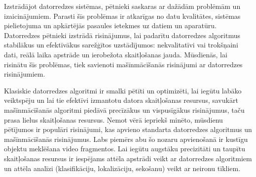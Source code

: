 Izstrādājot datorredzes sistēmas, pētnieki saskaras ar dažādām problēmām un izaicinājumiem. Parasti šīs problēmas ir atkarīgas no datu kvalitātes, sistēmas pielietojuma un apkārtējās pasaules ietekmes uz datiem un aparatūru. Datorredzes pētnieki izstrādā risinājumus, lai padarītu datorredzes algoritmus stabilākus un efektīvākus sarežģītos uzstādījumos: nekvalitatīvi vai trokšņaini dati, reālā laika apstrāde un ierobežota skaitļošanas jauda. Mūsdienās, lai risinātu šīs problēmas, tiek savienoti mašīnmācīšanās risinājumi ar datorredzes risinājumiem.

Klasiskie datorredzes algoritmi ir smalki pētīti un optimizēti, lai iegūtu labāko veiktspēju un lai tie efektīvi izmantotu datora skaitļošanas resursus, savukārt mašīnmācīšanās algoritmi piedāvā precīzākus un vispusīgākus risinājumus, taču prasa lielus skaitļošanas resursus. Ņemot vērā iepriekš minēto, mūsdienu pētījumos ir populāri risinājumi, kas apvieno standarta datorredzes algoritmus un mašīnmācīšanās risinājumus. Labs piemērs abu šo nozaru apvienošanā ir kustīgu objektu meklēšana video fragmentos. Lai iegūtu augstāku precizitāti un taupītu skaitļošanas resursus ir iespējams attēla apstrādi veikt ar datorredzes algoritmiem un attēla analīzi (klasifikāciju, lokalizāciju, sekošanu) veikt ar neironu tīkliem.



